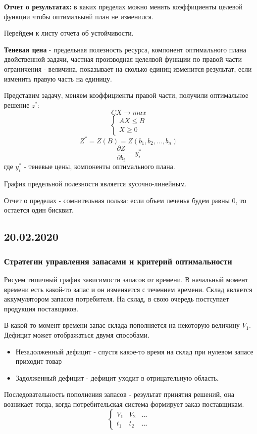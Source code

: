 \documentclass[aps,%
12pt,%
final,%
oneside,
onecolumn,%
musixtex, %
superscriptaddress,%
centertags]{article} %
\theoremstyle{plain}
\begin{document}
\textbf{Отчет о результатах:} в каких пределах можно менять коэффициенты целевой функции чтобы оптимальынй план не изменился.

Перейдем к листу отчета об устойчивости.

\textbf{Теневая цена} - предельная полезность ресурса, компонент оптимального плана двойственной задачи, частная производная целелвой функции по правой части ограничения - величина, показывает на сколько единиц изменится результат, если изменить правую часть на единицу.

Представим задачу, меняем коэффициенты правой части, получили оптимальное решение $z^{*}$:
$$CX \to max$$
$$ \left\{
\begin{matrix}
AX \leq B \\ 
X \geq 0
\end{matrix}\right. $$
$$ Z^{*} = Z(B) = Z(b_1,b_2,...,b_n)$$
$$ \frac{\partial Z}{\partial b_i} =y_i^*$$
где $y_i^*$ - теневые цены, компоненты оптимального плана.

График предельной полезности является кусочно-линейным.

Отчет о пределах - сомнительная польза: если объем печенья будем равны $0$, то остается один бисквит.

\subsection{20.02.2020}
\subsubsection{Стратегии управления запасами и критерий оптимальности}

Рисуем типичный график зависимости запасов от времени. В начальный момент времени есть какой-то запас и он изменяется с течением времени. Склад является аккумулятором запасов потребителя. На склад, в свою очередь постсупает продукция поставщиков.

В какой-то момент времени запас склада пополняется на некоторую величину $V_1$.
Дефицит может отображаться двумя способами. 
\begin{itemize}
	\item Незадолженный дефицит - спустя какое-то время на склад при нулевом запасе приходит товар
	\item Задолженный дефицит - дефицит уходит в отрицательную область.
\end{itemize}

Последовательность пополнения запасов - результат принятия решений, она возникает тогда, когда потребительская система формирует заказ поставщикам.
$$ \left\{
\begin{matrix}
V_1 & V_2 & \ldots \\
t_1 & t_2 & \ldots
\end{matrix} \right.$$
\end{document}
